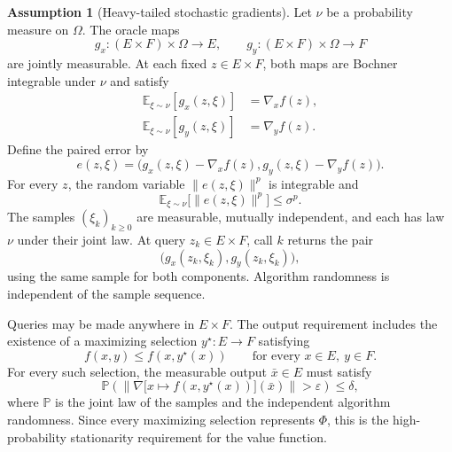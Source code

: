 \documentclass[10pt]{article}
\theoremstyle{definition}
\newtheorem{assumption}{Assumption}
\begin{document}
\begin{assumption}[Heavy-tailed stochastic gradients]
Let $\nu$ be a probability measure on $\Omega$. The oracle maps
\[
g_x:(E\times F)\times\Omega\to E,
\qquad g_y:(E\times F)\times\Omega\to F
\]
are jointly measurable. At each fixed $z\in E\times F$, both maps are Bochner integrable under $\nu$ and satisfy
\[
\begin{aligned}
\mathbb{E}_{\xi\sim\nu}[g_x(z,\xi)]&=\nabla_x f(z),\\
\mathbb{E}_{\xi\sim\nu}[g_y(z,\xi)]&=\nabla_y f(z).
\end{aligned}
\]
Define the paired error by
\[
e(z,\xi)=\bigl(g_x(z,\xi)-\nabla_x f(z),
                 g_y(z,\xi)-\nabla_y f(z)\bigr).
\]
For every $z$, the random variable $\|e(z,\xi)\|^p$ is integrable and
\[
\mathbb{E}_{\xi\sim\nu}\bigl[\|e(z,\xi)\|^p\bigr]\leq\sigma^p.
\]
The samples $(\xi_k)_{k\geq0}$ are measurable, mutually independent, and each has law $\nu$ under their joint law. At query $z_k\in E\times F$, call $k$ returns the pair
\[
\bigl(g_x(z_k,\xi_k),g_y(z_k,\xi_k)\bigr),
\]
using the same sample for both components. Algorithm randomness is independent of the sample sequence.
\end{assumption}

Queries may be made anywhere in $E\times F$. The output requirement includes the existence of a maximizing selection $y^\star:E\to F$ satisfying
\[
f(x,y)\leq f(x,y^\star(x))
\qquad\text{for every }x\in E,\ y\in F.
\]
For every such selection, the measurable output $\bar{x}\in E$ must satisfy
\[
\mathbb{P}\!\left(
\left\|\nabla\bigl[x\mapsto f(x,y^\star(x))\bigr](\bar{x})\right\|
>\varepsilon\right)\leq\delta,
\]
where $\mathbb{P}$ is the joint law of the samples and the independent algorithm randomness. Since every maximizing selection represents $\Phi$, this is the high-probability stationarity requirement for the value function.
\end{document}
